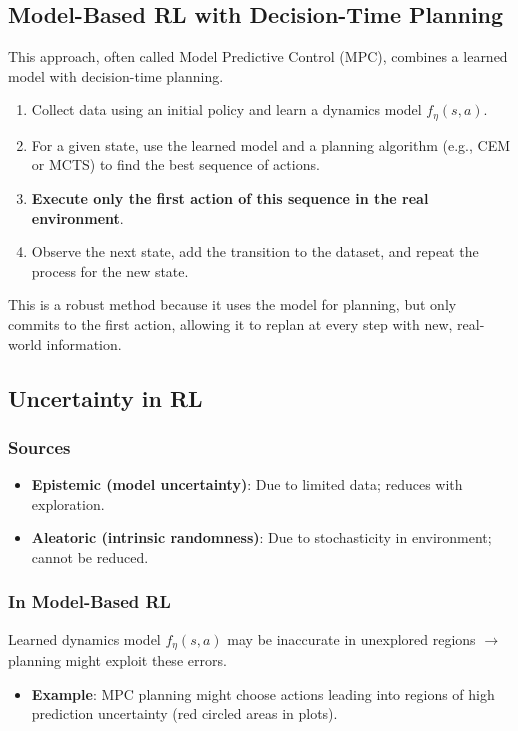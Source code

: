 \documentclass[12pt]{article}
\begin{document}
\subsection{Model-Based RL with Decision-Time Planning}
This approach, often called Model Predictive Control (MPC), combines a learned model with decision-time planning.
\begin{enumerate}
    \item Collect data using an initial policy and learn a dynamics model $f_\eta(s,a)$.
    \item For a given state, use the learned model and a planning algorithm (e.g., CEM or MCTS) to find the best sequence of actions.
    \item \textbf{Execute only the first action of this sequence in the real environment}.
    \item Observe the next state, add the transition to the dataset, and repeat the process for the new state.
\end{enumerate}
This is a robust method because it uses the model for planning, but only commits to the first action, allowing it to replan at every step with new, real-world information.

\subsection{Uncertainty in RL}

\subsubsection{Sources}
\begin{itemize}
    \item \textbf{Epistemic (model uncertainty)}: Due to limited data; reduces with exploration.
    \item \textbf{Aleatoric (intrinsic randomness)}: Due to stochasticity in environment; cannot be reduced.
\end{itemize}

\subsubsection{In Model-Based RL}
Learned dynamics model $f_\eta(s,a)$ may be inaccurate in unexplored regions $\rightarrow$ planning might exploit these errors.
\begin{itemize}
    \item \textbf{Example}: MPC planning might choose actions leading into regions of high prediction uncertainty (red circled areas in plots).
\end{itemize}
\end{document}
